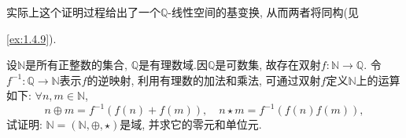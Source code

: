 \begin{remark}
    实际上这个证明过程给出了一个$\mathbb{Q}$-线性空间的基变换, 从而两者将同构(见\par\ref{ex:1.4.9}).
\end{remark}

\begin{problem}\label{ex:1.1.4}
    设$\mathbb{N}$是所有正整数的集合, $\mathbb{Q}$是有理数域.因$\mathbb{Q}$是可数集, 故存在双射$f:\mathbb{N} \to \mathbb{Q}$. 令$f^{-1}:\mathbb{Q} \to \mathbb{N}$表示$f$的逆映射, 利用有理数的加法和乘法, 可通过双射$f$定义$\mathbb{N}$上的运算如下: $\forall n, m \in \mathbb{N}$,
    \[
        n \oplus m = f^{-1}(f(n) + f(m)), \quad n \star m = f^{-1}(f(n)f(m)),
    \]
    试证明: $\mathbb{N} = (\mathbb{N}, \oplus, \star)$是域, 并求它的零元和单位元.
\end{problem}

